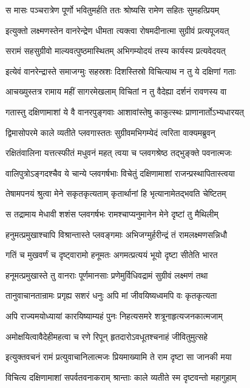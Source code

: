 \twolineshloka
{स मासः पञ्चरात्रेण पूर्णो भवितुमर्हति}
{ततः श्रोष्यसि रामेण सहितः सुमहत्प्रियम्}


\twolineshloka
{इत्युक्तो लक्ष्मणस्तेन वानरेन्द्रेण धीमता}
{त्यक्त्वा रोषमदीनात्मा सुग्रीवं प्रत्यपूजयत्}


\twolineshloka
{सरामं सहसुग्रीवो माल्यवत्पुष्ठमास्थितम्}
{अभिगम्योदयं तस्य कार्यस्य प्रत्यवेदयत्}


\twolineshloka
{इत्येवं वानरेन्द्रास्ते समाजग्मुः सहस्रशः}
{दिशस्तिस्रो विचित्याथ न तु ये दक्षिणां गताः}


\twolineshloka
{आचख्युस्तत्र रामाय महीं सागरमेखलाम्}
{विचितां न तु वैदेह्या दर्शनं रावणस्य वा}


\twolineshloka
{गतास्तु दक्षिणामाशां ये वै वानरपुङ्गवाः}
{आशावांस्तेषु काकुत्स्थः प्राणानार्तोऽभ्यधारयत्}


\twolineshloka
{द्विमासोपरमे काले व्यतीते प्लवगास्ततः}
{सुग्रीवमभिगम्येदं त्वरिता वाक्यमब्रुवन्}


\twolineshloka
{रक्षितंवालिना यत्तत्स्फीतं मधुवनं महत्}
{त्वया च प्लवगश्रेष्ठ तद्भुङ्क्ते पवनात्मजः}


\twolineshloka
{वालिपुत्रोऽङ्गदश्चैव ये चान्ये प्लवगर्षभाः}
{विचेतुं दक्षिणामाशां राजन्प्रस्थापितास्त्वया}


\twolineshloka
{तेषामपनयं श्रुत्वा मेने सकृतकृत्यताम्}
{कृतार्थानां हि भृत्यानामेतद्भवति चेष्टितम्}


\twolineshloka
{स तद्रामाय मेधावी शशंस प्लवगर्षभः}
{रामश्चाप्यनुमानेन मेने दृष्टां तु मैथिलीम्}


\twolineshloka
{हनुमत्प्रमुखाश्चापि विश्रान्तास्ते प्लवङ्गमाः}
{अभिजग्मुर्हरीन्द्रं तं रामलक्ष्मणसन्निधौ}


\twolineshloka
{गतिं च मुखवर्णं च दृष्ट्वारामो हनूमतः}
{अगमत्प्रत्ययं भूयो दृष्टा सीतेति भारत}


\twolineshloka
{हनूमत्प्रमुखास्ते तु वानराः पूर्णमानसाः}
{प्रणेमुर्विधिवद्रामं सुग्रीवं लक्ष्मणं तथा}


\twolineshloka
{तानुवाचानतान्रामः प्रगृह्य सशरं धनुः}
{अपि मां जीवयिष्यध्वमपि वः कृतकृत्यता}


\twolineshloka
{अपि राज्यमयोध्यायां कारयिष्याम्यहं पुनः}
{निहत्यसमरे शत्रूनाहृत्यजनकात्मजाम्}


\twolineshloka
{अमोक्षयित्वावैदेहीमहत्वा च रणे रिपून्}
{हृतदारोऽवधूतश्चनाहं जीवितुमुत्सहे}


\twolineshloka
{इत्युक्तवचनं रामं प्रत्युवाचानिलात्मजः}
{प्रियमाख्यामि ते राम दृष्टा सा जानकी मया}


\twolineshloka
{विचित्य दक्षिणामाशां सपर्वतवनाकराम्}
{श्रान्ताः काले व्यतीते स्म दृष्टवन्तो महागुहाम्}



